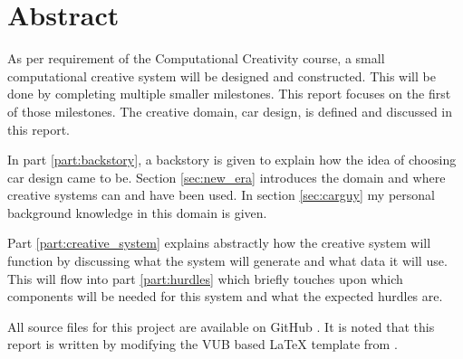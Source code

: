 \chapter*{Abstract}
As per requirement of the Computational Creativity course, a small computational creative system will be designed and constructed.
This will be done by completing multiple smaller milestones.
This report focuses on the first of those milestones.
The creative domain, car design, is defined and discussed in this report.

In part \ref{part:backstory}, a backstory is given to explain how the idea of choosing car design came to be. Section \ref{sec:new_era} introduces the domain and where creative systems can and have been used.
In section \ref{sec:carguy} my personal background knowledge in this domain is given.

Part \ref{part:creative_system} explains abstractly how the creative system will function by discussing what the system will generate and what data it will use.
This will flow into part \ref{part:hurdles} which briefly touches upon which components will be needed for this system and what the expected hurdles are.

All source files for this project are available on GitHub \citep{github_project}. It is noted that this report is written by modifying the VUB based \LaTeX{} template from \citet{latex_template}. 